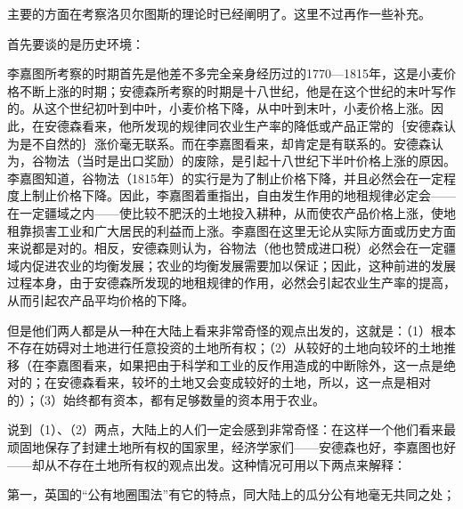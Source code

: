 主要的方面在考察洛贝尔图斯的理论时已经阐明了。这里不过再作一些补充。

首先要谈的是历史环境：

李嘉图所考察的时期首先是他差不多完全亲身经历过的1770—1815年，这是小麦价格不断上涨的时期；安德森所考察的时期是十八世纪，他是在这个世纪的末叶写作的。从这个世纪初叶到中叶，小麦价格下降，从中叶到末叶，小麦价格上涨。因此，在安德森看来，他所发现的规律同农业生产率的降低或产品正常的｛安德森认为是不自然的｝涨价毫无联系。而在李嘉图看来，却肯定是有联系的。安德森认为，谷物法（当时是出口奖励）的废除，是引起十八世纪下半叶价格上涨的原因。李嘉图知道，谷物法（1815年）的实行是为了制止价格下降，并且必然会在一定程度上制止价格下降。因此，李嘉图着重指出，自由发生作用的地租规律必定会——在一定疆域之内——使比较不肥沃的土地投入耕种，从而使农产品价格上涨，使地租靠损害工业和广大居民的利益而上涨。李嘉图在这里无论从实际方面或历史方面来说都是对的。相反，安德森则认为，谷物法（他也赞成进口税）必然会在一定疆域内促进农业的均衡发展；农业的均衡发展需要加以保证；因此，这种前进的发展过程本身，由于安德森所发现的地租规律的作用，必然会引起农业生产率的提高，从而引起农产品平均价格的下降。

但是他们两人都是从一种在大陆上看来非常奇怪的观点出发的，这就是：（1）根本不存在妨碍对土地进行任意投资的土地所有权；（2）从较好的土地向较坏的土地推移（在李嘉图看来，如果把由于科学和工业的反作用造成的中断除外，这一点是绝对的；在安德森看来，较坏的土地又会变成较好的土地，所以，这一点是相对的）；（3）始终都有资本，都有足够数量的资本用于农业。

说到（1）、（2）两点，大陆上的人们一定会感到非常奇怪：在这样一个他们看来最顽固地保存了封建土地所有权的国家里，经济学家们——安德森也好，李嘉图也好——却从不存在土地所有权的观点出发。这种情况可用以下两点来解释：

第一，英国的“公有地圈围法”有它的特点，同大陆上的瓜分公有地毫无共同之处；

